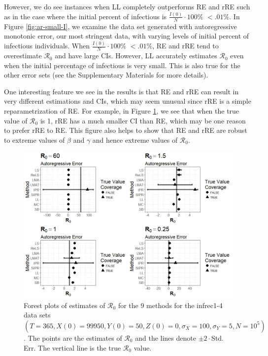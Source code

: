 \documentclass[12pt]{article}
\newcommand{\xxsir}{\ensuremath{9} } %
\newcommand{\rr}{\ensuremath{\mathcal{R}_0}}
\begin{document}
However, we do see instances when LL completely outperforms RE and rRE such as in the case where the initial percent of infectious is $\frac{I(0)}{N} \cdot 100\%$ $< .01$\%. In Figure \ref{fig:ar-small-I}, we examine the data set generated with autoregressive monotonic error, our most stringent data, with varying levels of initial percent of infectious individuals.  When $\frac{I(0)}{N} \cdot 100\%$ $< .01$\%, RE and rRE tend to overestimate $\rr$ and have large CIs.  However, LL accurately estimates $\rr$ even when the initial percentage of infectious is very small.  This is also true for the other error sets (see the Supplementary Materials for more details).

One interesting feature we see in the results is that RE and rRE can result in very different estimations and CIs, which may seem unusual since rRE is a simple reparametrization of RE.  For example, in Figure \ref{fig:ar-r0}, we see that when the true value of $\rr$ is 1, rRE has a much smaller CI than RE, which may be one reason to prefer rRE to RE.  This figure also helps to show that RE and rRE are robust to extreme values of $\beta$ and $\gamma$ and hence extreme values of $\rr$.

\begin{figure}[H]
	\centering
	\includegraphics[scale=0.5]{images/parchange_ar.jpeg}
	\caption{Forest plots of estimates of $\rr$ for the \xxsir methods for the infrec1-4 data sets $(T=365, X(0)=99950, Y(0)=50, Z(0)=0, \sigma_X=100, \sigma_Y=5, N=10^5)$.  The points are the estimates of $\rr$ and the lines denote $\pm 2\cdot $Std. Err.  The vertical line is the true $\rr$ value.}\label{fig:ar-r0}
\end{figure}
\end{document}
